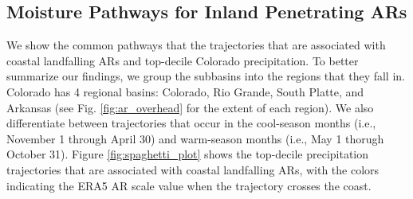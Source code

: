 \documentclass[draft]{agujournal2019}
\begin{document}
\subsection{Moisture Pathways for Inland Penetrating ARs}
\label{sec:results:moisture_pathways}
%

We show the common pathways that the trajectories that are associated with coastal landfalling ARs and top-decile Colorado precipitation. To better summarize our findings, we group the subbasins into the regions that they fall in. Colorado has 4 regional basins: Colorado, Rio Grande, South Platte, and Arkansas (see Fig. \ref{fig:ar_overhead} for the extent of each region). We also differentiate between trajectories that occur in the cool-season months (i.e., November 1 through April 30) and warm-season months (i.e., May 1 thorugh October 31). Figure \ref{fig:spaghetti_plot} shows the top-decile precipitation trajectories that are associated with coastal landfalling ARs, with the colors indicating the ERA5 AR scale value when the trajectory crosses the coast. 
\end{document}
